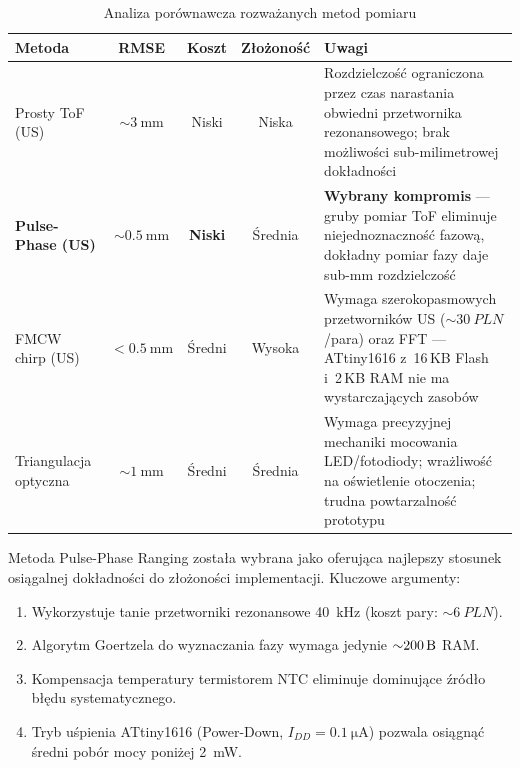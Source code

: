 \documentclass[a4paper,11pt]{article}
\begin{document}
\begin{table}[H]
    \centering
    \caption{Analiza porównawcza rozważanych metod pomiaru}
    \label{tab:porownanie_metod}
    \begin{tabularx}{\textwidth}{lcccX}
        \toprule
        \textbf{Metoda} & \textbf{RMSE} & \textbf{Koszt} & \textbf{Złożoność} & \textbf{Uwagi} \\
        \midrule
        Prosty ToF (US)
            & ${\sim}\SI{3}{\milli\metre}$
            & Niski
            & Niska
            & Rozdzielczość ograniczona przez czas narastania obwiedni przetwornika rezonansowego; brak możliwości sub-milimetrowej dokładności \\[6pt]
        \textbf{Pulse-Phase (US)}
            & ${\sim}\SI{0,5}{\milli\metre}$
            & \textbf{Niski}
            & Średnia
            & \textbf{Wybrany kompromis} --- gruby pomiar ToF eliminuje niejednoznaczność fazową, dokładny pomiar fazy daje sub-mm rozdzielczość \\[6pt]
        FMCW chirp (US)
            & ${<}\SI{0,5}{\milli\metre}$
            & Średni
            & Wysoka
            & Wymaga szerokopasmowych przetworników US (${\sim}\SI{30}{PLN}$/para) oraz FFT --- ATtiny1616 z~16\,KB Flash i~2\,KB RAM nie ma wystarczających zasobów \\[6pt]
        Triangulacja optyczna
            & ${\sim}\SI{1}{\milli\metre}$
            & Średni
            & Średnia
            & Wymaga precyzyjnej mechaniki mocowania LED/fotodiody; wrażliwość na oświetlenie otoczenia; trudna powtarzalność prototypu \\
        \bottomrule
    \end{tabularx}
\end{table}

Metoda Pulse-Phase Ranging została wybrana jako oferująca najlepszy stosunek
osiągalnej dokładności do złożoności implementacji. Kluczowe argumenty:

\begin{enumerate}[nosep]
    \item Wykorzystuje tanie przetworniki rezonansowe \SI{40}{\kilo\hertz} (koszt pary: ${\sim}\SI{6}{PLN}$).
    \item Algorytm Goertzela do wyznaczania fazy wymaga jedynie ${\sim}\SI{200}{\byte}$ RAM.
    \item Kompensacja temperatury termistorem NTC eliminuje dominujące źródło błędu systematycznego.
    \item Tryb uśpienia ATtiny1616 (Power-Down, $I_{DD} = \SI{0,1}{\micro\ampere}$) pozwala osiągnąć średni pobór mocy poniżej \SI{2}{\milli\watt}.
\end{enumerate}
\end{document}
